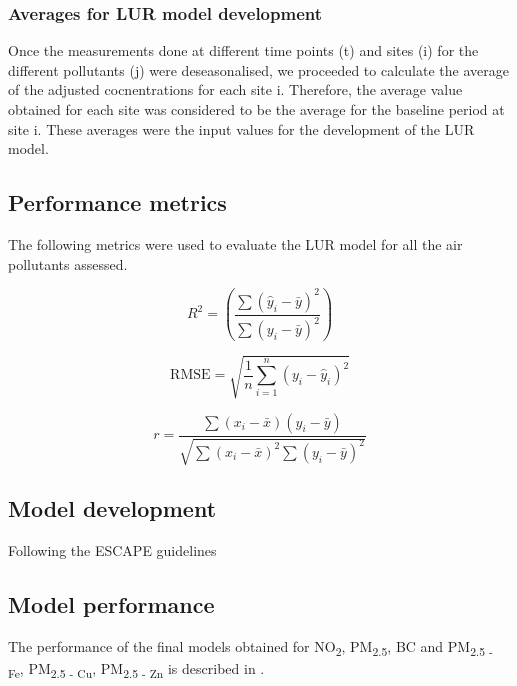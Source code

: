 \documentclass{article}
\begin{document}
\subsubsection{Averages for LUR model development}
Once the measurements done at different time points (t) and sites (i) for the different pollutants (j) were deseasonalised, we proceeded to calculate the average of the adjusted cocnentrations for each site i. Therefore, the average value obtained for each site was considered to be the average for the baseline period at site i. These averages were the input values for the development of the LUR model. 

\newpage
\subsection{Performance metrics}
The following metrics were used to evaluate the LUR model for all the air pollutants assessed. 

\begin{equation}
R^2 = \left( \frac{\sum (\hat{y}_i - \bar{y})^2}{\sum (y_i - \bar{y})^2} \right)
\end{equation}

\begin{equation}
\text{RMSE} = \sqrt{\frac{1}{n} \sum_{i=1}^{n} (y_i - \hat{y}_i)^2}
\end{equation}

\begin{equation}
r = \frac{\sum (x_i - \bar{x})(y_i - \bar{y})}{\sqrt{\sum (x_i - \bar{x})^2 \sum (y_i - \bar{y})^2}}
\end{equation}
\vspace{0.5 cm}

\subsection{Model development}

Following the ESCAPE guidelines 




\subsection{Model performance}
The performance of the final models obtained for NO\textsubscript{2}, PM\textsubscript{2.5}, BC and PM\textsubscript{2.5 - Fe}, PM\textsubscript{2.5 - Cu}, PM\textsubscript{2.5 - Zn} is described in \textbf{}.  
\end{document}
